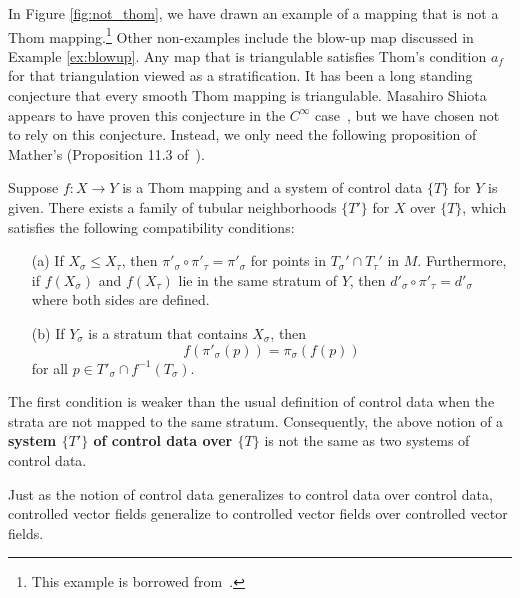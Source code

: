 In Figure \ref{fig:not_thom}, we have drawn an example of a mapping that is not a Thom mapping.\footnote{This example is borrowed from~\cite{lu-ctst}.} Other non-examples include the blow-up map discussed in Example \ref{ex:blowup}. Any map that is triangulable satisfies Thom's condition $a_f$ for that triangulation viewed as a stratification. It has been a long standing conjecture that every smooth Thom mapping is triangulable. Masahiro Shiota appears to have proven this conjecture in the $C^{\infty}$ case~\cite{shiota-thom}, but we have chosen not to rely on this conjecture. Instead, we only need the following proposition of Mather's (Proposition 11.3 of~\cite{mather}).

\begin{prop}\label{prop:thom_data}
	Suppose $f:X \to Y$ is a Thom mapping and a system of control data $\{T\}$ for $Y$ is given. There exists a family of tubular neighborhoods $\{T'\}$ for $X$ over $\{T\}$, which satisfies the following compatibility conditions:
	\begin{enumerate}
		\item[(a)] If $X_{\sigma}\leq X_{\tau}$, then $\pi'_{\sigma} \circ \pi'_{\tau}=\pi'_{\sigma}$ for points in $T_{\sigma}'\cap T_{\tau}'$ in $M$. Furthermore, if $f(X_{\sigma})$ and $f(X_{\tau})$ lie in the same stratum of $Y$, then $d'_{\sigma}\circ \pi'_{\tau}=d'_{\sigma}$ where both sides are defined.
		\item[(b)] If $Y_{\sigma}$ is a stratum that contains $X_{\sigma}$, then
		\[
			f(\pi'_{\sigma}(p))=\pi_{\sigma}(f(p))
		\]
		for all $p\in T'_{\sigma}\cap f^{-1}(T_{\sigma})$.
	\end{enumerate}
\end{prop}
\begin{rmk}
	The first condition is weaker than the usual definition of control data when the strata are not mapped to the same stratum. Consequently, the above notion of a \textbf{system $\{T'\}$ of control data over $\{T\}$} is not the same as two systems of control data.
\end{rmk}

Just as the notion of control data generalizes to control data over control data, controlled vector fields generalize to controlled vector fields over controlled vector fields.

